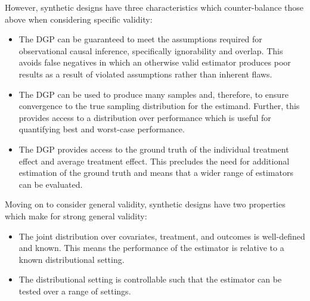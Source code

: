 \documentclass[../main.tex]{subfiles}
\begin{document}
\vspace{\baselineskip}

However, synthetic designs have three characteristics which counter-balance those above when considering specific validity:\par

\vspace{\baselineskip}

\begin{itemize}
    \item The DGP can be guaranteed to meet the assumptions required for observational causal inference, specifically ignorability and overlap. This avoids false negatives in which an otherwise valid estimator produces poor results as a result of violated assumptions rather than inherent flaws.\par

    \vspace{\baselineskip}

    \item The DGP can be used to produce many samples and, therefore, to ensure convergence to the true sampling distribution for the estimand. Further, this provides access to a distribution over performance which is useful for quantifying best and worst-case performance.\par


    \vspace{\baselineskip}
    
    \item The DGP provides access to the ground truth of the individual treatment effect and average treatment effect. This precludes the need for additional estimation of the ground truth and means that a wider range of estimators can be evaluated.
\end{itemize}\par


\vspace{\baselineskip}
Moving on to consider general validity, synthetic designs have two properties which make for strong general validity:\par


\vspace{\baselineskip}
\begin{itemize}
    \item The joint distribution over covariates, treatment, and outcomes is well-defined and known. This means the performance of the estimator is relative to a known distributional setting.\par


\vspace{\baselineskip}
    \item The distributional setting is controllable such that the estimator can be tested over a range of settings.
\end{itemize}\par
\end{document}
